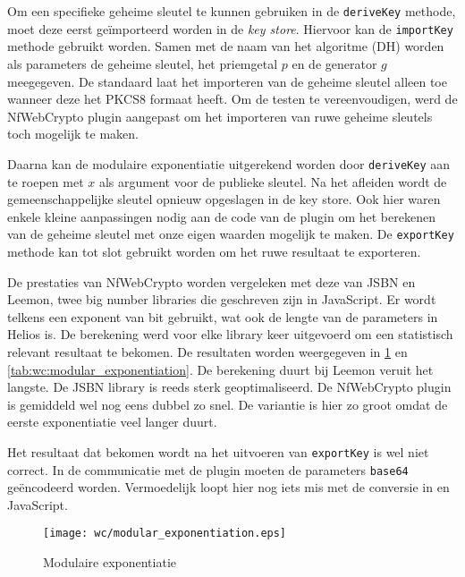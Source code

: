 \npar Om een specifieke geheime sleutel te kunnen gebruiken in de \texttt{deriveKey} methode, moet deze eerst ge\"importeerd worden in de \textit{key store}. Hiervoor kan de \texttt{importKey} methode gebruikt worden. Samen met de naam van het algoritme (DH) worden als parameters de geheime sleutel, het priemgetal $p$ en de generator $g$ meegegeven. De standaard laat het importeren van de geheime sleutel alleen toe wanneer deze het PKCS8 formaat heeft.\cite{rfc5208} Om de testen te vereenvoudigen, werd de NfWebCrypto plugin aangepast om het importeren van ruwe geheime sleutels toch mogelijk te maken.

\npar Daarna kan de modulaire exponentiatie uitgerekend worden door \texttt{deriveKey} aan te roepen met $x$ als argument voor de publieke sleutel. Na het afleiden wordt de gemeenschappelijke sleutel opnieuw opgeslagen in de key store. Ook hier waren enkele kleine aanpassingen nodig aan de code van de plugin om het berekenen van de geheime sleutel met onze eigen waarden mogelijk te maken. De \texttt{exportKey} methode kan tot slot gebruikt worden om het ruwe resultaat te exporteren. 

\npar De prestaties van NfWebCrypto worden vergeleken met deze van JSBN en Leemon, twee big number libraries die geschreven zijn in JavaScript.\cite{site:wu_rsa_and_ecc_in_javascript}\cite{site:baird_big_integers_in_javascript} Er wordt telkens een exponent van  bit gebruikt, wat ook de lengte van de parameters in Helios is. De berekening werd voor elke library  keer uitgevoerd om een statistisch relevant resultaat te bekomen. De resultaten worden weergegeven in \ref{fig:wc:modular_exponentiation} en \ref{tab:wc:modular_exponentiation}. De berekening duurt bij Leemon veruit het langste. De JSBN library is reeds sterk geoptimaliseerd. De NfWebCrypto plugin is gemiddeld wel nog eens dubbel zo snel. De variantie is hier zo groot omdat de eerste exponentiatie veel langer duurt.

\npar Het resultaat dat bekomen wordt na het uitvoeren van \texttt{exportKey} is wel niet correct. In de communicatie met de plugin moeten de parameters \texttt{base64} ge\"encodeerd worden. Vermoedelijk loopt hier nog iets mis met de conversie in \cplusplus en JavaScript.

\begin{figure}
  \centering
  \texttt{[image: wc/modular\_exponentiation.eps]}
  \caption{Modulaire exponentiatie}
  \label{fig:wc:modular_exponentiation}
\end{figure}

